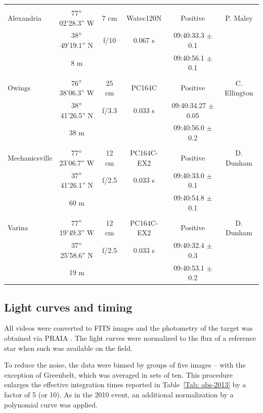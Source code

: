 \documentclass[useAMS,usenatbib]{mn2e}
\begin{document}
\begin{table}
\begin{minipage}{140mm}
\begin{tabular}{@{}lccccc}
 & & & & & \\
 Alexandria & 77$\hbox{$^\circ$}$02'28.3'' W & 7 cm & Watec120N & Positive & P. Maley \\
  &38$\hbox{$^\circ$}$49'19.1'' N & f/10 &  0.067 s   & 09:40:33.3 $\pm$ 0.1 &   \\
            & 8 m       &   &     & 09:40:56.1  $\pm$ 0.1 &   \\
 & & & & & \\
 Owings & 76$\hbox{$^\circ$}$38'06.3'' W & 25 cm & PC164C  & Positive & C. Ellington \\
  &38$\hbox{$^\circ$}$41'26.5'' N & f/3.3 &  0.033 s & 09:40:34.27 $\pm$ 0.05 &   \\
            & 38 m                &       &     & 09:40:56.0  $\pm$ 0.2 &   \\
 & & & & & \\
 Mechanicsville & 77$\hbox{$^\circ$}$23'06.7'' W & 12 cm & PC164C-EX2 & Positive & D. Dunham \\
  &37$\hbox{$^\circ$}$41'26.1'' N & f/2.5 & 0.033 s    & 09:40:33.0 $\pm$ 0.1 &   \\
            & 60 m      &   &     & 09:40:54.8  $\pm$ 0.1 &   \\
 & & & & & \\
 Varina & 77$\hbox{$^\circ$}$19'49.3'' W & 12 cm & PC164C-EX2 & Positive & D. Dunham \\
  &37$\hbox{$^\circ$}$25'58.6'' N & f/2.5 &  0.033 s   & 09:40:32.4 $\pm$ 0.3 &   \\
            & 19 m      &   &     & 09:40:53.1  $\pm$ 0.2 &   \\

\hline
\end{tabular}
\end{minipage}
\end{table}

\subsection{Light curves and timing}

All videos were converted to FITS images and the photometry of the target was obtained via PRAIA \citep{2011gfun.conf...85A}. The light curves were normalized to the flux of a reference star when such was available on the field.

To reduce the noise, the data were binned by groups of five images -- with the exception of  Greenbelt, which was averaged in sets of ten. This procedure enlarges the effective integration times reported in Table~\ref{Tab: obs-2013} by a factor of 5 (or 10). As in the 2010 event, an additional normalization by a polynomial curve was applied.
\end{document}
